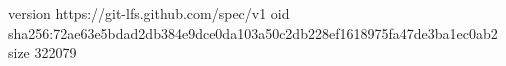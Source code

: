 version https://git-lfs.github.com/spec/v1
oid sha256:72ae63e5bdad2db384e9dce0da103a50c2db228ef1618975fa47de3ba1ec0ab2
size 322079
